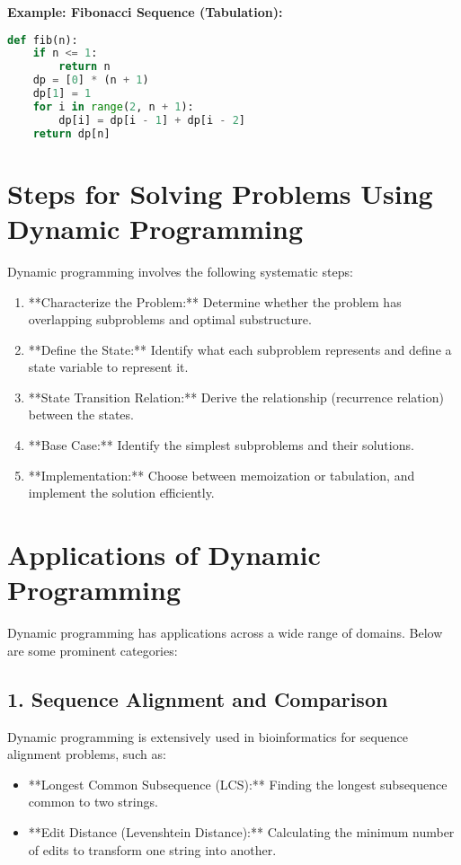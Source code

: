 \textbf{Example: Fibonacci Sequence (Tabulation):}
\begin{lstlisting}[language=Python]
def fib(n):
    if n <= 1:
        return n
    dp = [0] * (n + 1)
    dp[1] = 1
    for i in range(2, n + 1):
        dp[i] = dp[i - 1] + dp[i - 2]
    return dp[n]
\end{lstlisting}

\section*{Steps for Solving Problems Using Dynamic Programming}

Dynamic programming involves the following systematic steps:

\begin{enumerate}
    \item **Characterize the Problem:** Determine whether the problem has overlapping subproblems and optimal substructure.
    \item **Define the State:** Identify what each subproblem represents and define a state variable to represent it.
    \item **State Transition Relation:** Derive the relationship (recurrence relation) between the states.
    \item **Base Case:** Identify the simplest subproblems and their solutions.
    \item **Implementation:** Choose between memoization or tabulation, and implement the solution efficiently.
\end{enumerate}

\section*{Applications of Dynamic Programming}

Dynamic programming has applications across a wide range of domains. Below are some prominent categories:

\subsection*{1. Sequence Alignment and Comparison}
Dynamic programming is extensively used in bioinformatics for sequence alignment problems, such as:
\begin{itemize}
    \item **Longest Common Subsequence (LCS):** Finding the longest subsequence common to two strings.
    \item **Edit Distance (Levenshtein Distance):** Calculating the minimum number of edits to transform one string into another.
\end{itemize}

